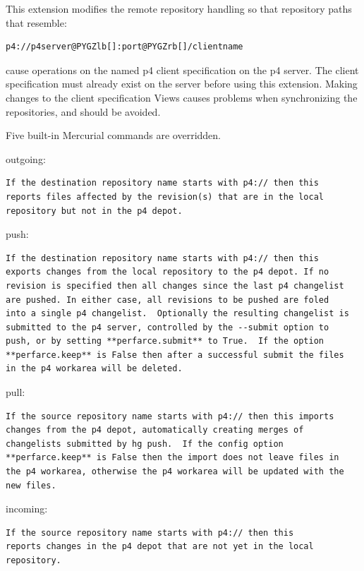 \documentclass[letterpaper,10pt,english]{manual}
\begin{document}
This extension modifies the remote repository handling so that repository
paths that resemble:

\begin{Verbatim}[commandchars=@\[\]]
p4://p4server@PYGZlb[]:port@PYGZrb[]/clientname
\end{Verbatim}

cause operations on the named p4 client specification on the p4 server.
The client specification must already exist on the server before using
this extension. Making changes to the client specification Views causes
problems when synchronizing the repositories, and should be avoided.

Five built-in Mercurial commands are overridden.

outgoing:

\begin{Verbatim}[commandchars=@\[\]]
If the destination repository name starts with p4:// then this
reports files affected by the revision(s) that are in the local
repository but not in the p4 depot.
\end{Verbatim}

push:

\begin{Verbatim}[commandchars=@\[\]]
If the destination repository name starts with p4:// then this
exports changes from the local repository to the p4 depot. If no
revision is specified then all changes since the last p4 changelist
are pushed. In either case, all revisions to be pushed are foled
into a single p4 changelist.  Optionally the resulting changelist is
submitted to the p4 server, controlled by the --submit option to
push, or by setting **perfarce.submit** to True.  If the option
**perfarce.keep** is False then after a successful submit the files
in the p4 workarea will be deleted.
\end{Verbatim}

pull:

\begin{Verbatim}[commandchars=@\[\]]
If the source repository name starts with p4:// then this imports
changes from the p4 depot, automatically creating merges of
changelists submitted by hg push.  If the config option
**perfarce.keep** is False then the import does not leave files in
the p4 workarea, otherwise the p4 workarea will be updated with the
new files.
\end{Verbatim}

incoming:

\begin{Verbatim}[commandchars=@\[\]]
If the source repository name starts with p4:// then this
reports changes in the p4 depot that are not yet in the local
repository.
\end{Verbatim}
\end{document}
